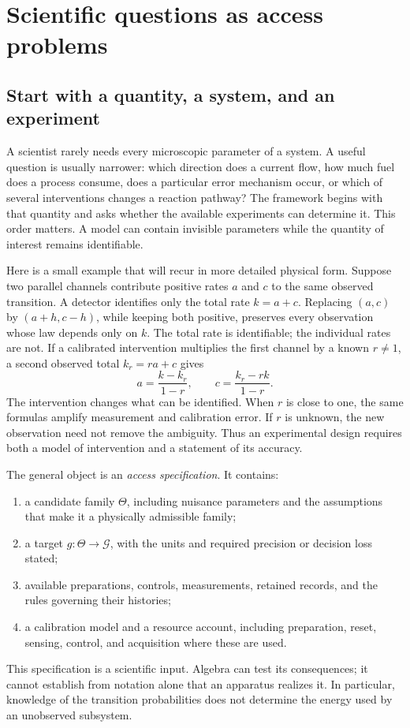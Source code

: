 \chapter{Scientific questions as access problems}
\label{foundations:chapter}

\section{Start with a quantity, a system, and an experiment}

A scientist rarely needs every microscopic parameter of a system. A useful
question is usually narrower: which direction does a current flow, how much
fuel does a process consume, does a particular error mechanism occur, or which
of several interventions changes a reaction pathway? The framework begins
with that quantity and asks whether the available experiments can determine
it. This order matters. A model can contain invisible parameters while the
quantity of interest remains identifiable.

Here is a small example that will recur in more detailed physical form.
Suppose two parallel channels contribute positive rates $a$ and $c$ to the
same observed transition. A detector identifies only the total rate
$k=a+c$. Replacing $(a,c)$ by $(a+h,c-h)$, while keeping both positive,
preserves every observation whose law depends only on $k$. The total rate
is identifiable; the individual rates are not. If a calibrated intervention
multiplies the first channel by a known $r\ne1$, a second observed total
$k_r=ra+c$ gives
\begin{equation}\label{foundations:twochannel}
 a=\frac{k-k_r}{1-r},\qquad c=\frac{k_r-rk}{1-r}.
\end{equation}
The intervention changes what can be identified. When $r$ is close to one,
the same formulas amplify measurement and calibration error. If $r$ is
unknown, the new observation need not remove the ambiguity. Thus an
experimental design requires both a model of intervention and a statement
of its accuracy.

The general object is an \emph{access specification}. It contains:
\begin{enumerate}
\item a candidate family $\Theta$, including nuisance parameters and the
      assumptions that make it a physically admissible family;
\item a target $g:\Theta\to\mathcal G$, with the units and required
      precision or decision loss stated;
\item available preparations, controls, measurements, retained records,
      and the rules governing their histories;
\item a calibration model and a resource account, including preparation,
      reset, sensing, control, and acquisition where these are used.
\end{enumerate}
This specification is a scientific input. Algebra can test its consequences;
it cannot establish from notation alone that an apparatus realizes it.
In particular, knowledge of the transition probabilities does not determine
the energy used by an unobserved subsystem.

